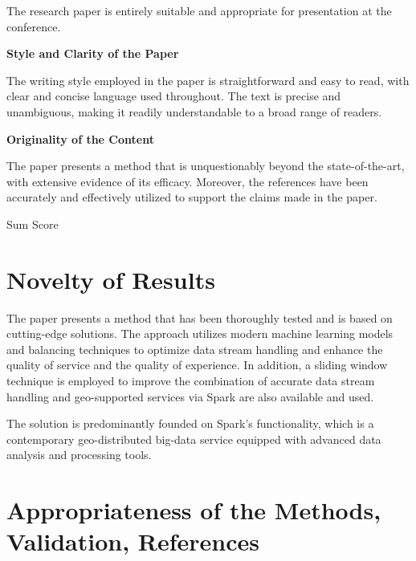 \documentclass[a4paper,12pt]{article}
\begin{document}
The research paper is entirely suitable and appropriate for presentation at the conference.

\bigskip


\textbf{Style and Clarity of the Paper}

The writing style employed in the paper is straightforward and easy to read, with clear and concise language used throughout. The text is precise and unambiguous, making it readily understandable to a broad range of readers.

\bigskip


\textbf{Originality of the Content}

The paper presents a method that is unquestionably beyond the state-of-the-art, with extensive evidence of its efficacy. Moreover, the references have been accurately and effectively utilized to support the claims made in the paper.

\bigskip


{\Large Sum Score } %


\section{Novelty of Results}

The paper presents a method that has been thoroughly tested and is based on cutting-edge solutions. The approach utilizes modern machine learning models and balancing techniques to optimize data stream handling and enhance the quality of service and the quality of experience. In addition, a sliding window technique is employed to improve the combination of accurate data stream handling and geo-supported services via Spark are also available and used.

The solution is predominantly founded on Spark's functionality, which is a contemporary geo-distributed big-data service equipped with advanced data analysis and processing tools.


\section{Appropriateness of the Methods,\\ Validation, References}
\end{document}
